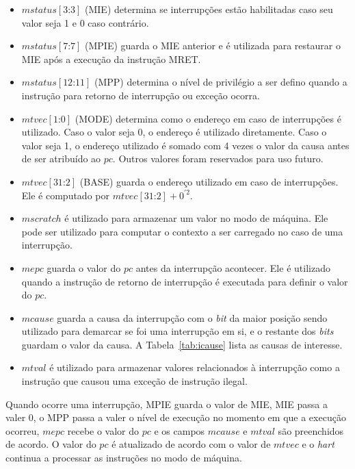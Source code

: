  \begin{itemize}
    \item $mstatus[3\text{:}3]$ (MIE) determina se interrupções estão habilitadas caso seu valor seja 1 e 0 caso contrário.
    \item $mstatus[7\text{:}7]$ (MPIE) guarda o MIE anterior e é utilizada para restaurar o MIE após a execução
          da instrução MRET.
    \item $mstatus[12\text{:}11]$ (MPP) determina o nível de privilégio a ser defino quando a instrução para retorno de 
          interrupção ou exceção ocorra.
    \item $mtvec[1\text{:}0]$ (MODE) determina como o endereço em caso de interrupções é utilizado. Caso o valor seja
          0, o endereço é utilizado diretamente. Caso o valor seja 1, o endereço utilizado é somado com 4 vezes o valor
          da causa antes de ser atribuído ao $pc$. Outros valores foram reservados para uso futuro.
    \item $mtvec[31\text{:}2]$ (BASE) guarda o endereço utilizado em caso de interrupções. Ele é computado por
          $ mtvec[31\text{:}2] + 0^{'2} $.
    \item $mscratch$ é utilizado para armazenar um valor no modo de máquina. Ele pode ser utilizado para computar o
          contexto a ser carregado no caso de uma interrupção.
    \item $mepc$ guarda o valor do $pc$ antes da interrupção acontecer. Ele é utilizado quando a instrução de retorno de
          interrupção é executada para definir o valor do $pc$.
    \item $mcause$ guarda a causa da interrupção com o \emph{bit} da maior posição sendo utilizado para demarcar se foi
          uma interrupção em si, e o restante dos \emph{bits} guardam o valor da causa.
          A Tabela~\ref{tab:icause} lista as causas de interesse.
    \item $mtval$ é utilizado para armazenar valores relacionados à interrupção como a instrução que causou uma exceção
          de instrução ilegal.
  \end{itemize}

  Quando ocorre uma interrupção, MPIE guarda o valor de MIE, MIE passa a valer 0, o MPP passa a valer o nível
  de execução no momento em que a execução ocorreu, $mepc$ recebe o valor do $pc$ e os campos $mcause$ e $mtval$
  são preenchidos de acordo. O valor do $pc$ é atualizado de acordo com o valor de $mtvec$ e o \emph{hart}
  continua a processar as instruções no modo de máquina.

